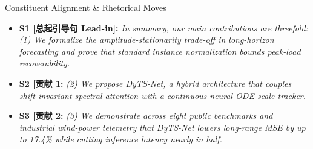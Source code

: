 \begin{TipBox}{Constituent Alignment \& Rhetorical Moves}
\begin{itemize}[leftmargin=1.5em]
  \item \textbf{S1 [总起引导句 Lead-in]:} \textit{In summary, our main contributions are threefold: (1) We formalize the amplitude-stationarity trade-off in long-horizon forecasting and prove that standard instance normalization bounds peak-load recoverability.}\par{}
  \item \textbf{S2 [贡献 1:} \textit{(2) We propose DyTS-Net, a hybrid architecture that couples shift-invariant spectral attention with a continuous neural ODE scale tracker.}\par{}
  \item \textbf{S3 [贡献 2:} \textit{(3) We demonstrate across eight public benchmarks and industrial wind-power telemetry that DyTS-Net lowers long-range MSE by up to 17.4\% while cutting inference latency nearly in half.}\par{}
\end{itemize}
\end{TipBox}
\bigskip
